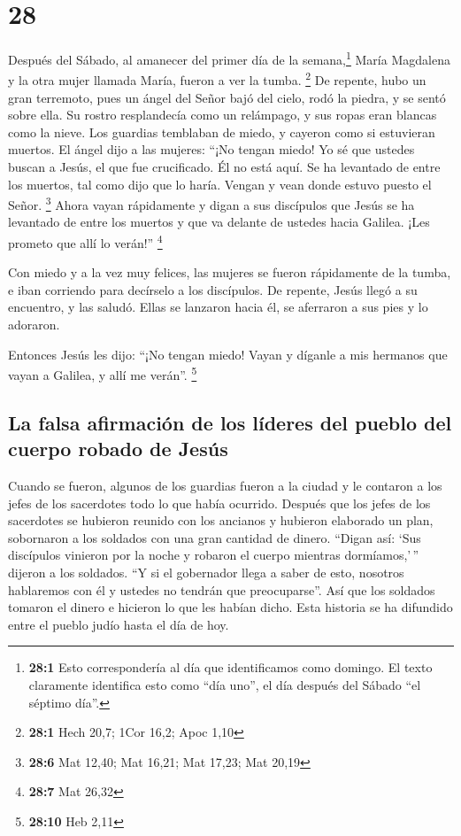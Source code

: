 \hypertarget{section-27}{%
\section{28}\label{section-27}}

 Después del Sábado, al amanecer del primer día de la
semana,\footnote{\textbf{28:1} Esto correspondería al día que
  identificamos como domingo. El texto claramente identifica esto como
  ``día uno'', el día después del Sábado ``el séptimo día''.} María
Magdalena y la otra mujer llamada María, fueron a ver la tumba.
\footnote{\textbf{28:1} Hech 20,7; 1Cor 16,2; Apoc 1,10} 
De repente, hubo un gran terremoto, pues un ángel del Señor bajó del
cielo, rodó la piedra, y se sentó sobre ella.  Su rostro
resplandecía como un relámpago, y sus ropas eran blancas como la nieve.
 Los guardias temblaban de miedo, y cayeron como si
estuvieran muertos.  El ángel dijo a las mujeres: ``¡No
tengan miedo! Yo sé que ustedes buscan a Jesús, el que fue crucificado.
 Él no está aquí. Se ha levantado de entre los muertos,
tal como dijo que lo haría. Vengan y vean donde estuvo puesto el Señor.
\footnote{\textbf{28:6} Mat 12,40; Mat 16,21; Mat 17,23; Mat 20,19}
 Ahora vayan rápidamente y digan a sus discípulos que
Jesús se ha levantado de entre los muertos y que va delante de ustedes
hacia Galilea. ¡Les prometo que allí lo verán!'' \footnote{\textbf{28:7}
  Mat 26,32}

 Con miedo y a la vez muy felices, las mujeres se fueron
rápidamente de la tumba, e iban corriendo para decírselo a los
discípulos.  De repente, Jesús llegó a su encuentro, y las
saludó. Ellas se lanzaron hacia él, se aferraron a sus pies y lo
adoraron.

 Entonces Jesús les dijo: ``¡No tengan miedo! Vayan y
díganle a mis hermanos que vayan a Galilea, y allí me verán''.
\footnote{\textbf{28:10} Heb 2,11}

\hypertarget{la-falsa-afirmaciuxf3n-de-los-luxedderes-del-pueblo-del-cuerpo-robado-de-jesuxfas}{%
\subsection{La falsa afirmación de los líderes del pueblo del cuerpo
robado de
Jesús}\label{la-falsa-afirmaciuxf3n-de-los-luxedderes-del-pueblo-del-cuerpo-robado-de-jesuxfas}}

 Cuando se fueron, algunos de los guardias fueron a la
ciudad y le contaron a los jefes de los sacerdotes todo lo que había
ocurrido.  Después que los jefes de los sacerdotes se
hubieron reunido con los ancianos y hubieron elaborado un plan,
sobornaron a los soldados con una gran cantidad de dinero.
 ``Digan así: `Sus discípulos vinieron por la noche y
robaron el cuerpo mientras dormíamos,'\,'' dijeron a los soldados.
 ``Y si el gobernador llega a saber de esto, nosotros
hablaremos con él y ustedes no tendrán que preocuparse''.
 Así que los soldados tomaron el dinero e hicieron lo que
les habían dicho. Esta historia se ha difundido entre el pueblo judío
hasta el día de hoy.


